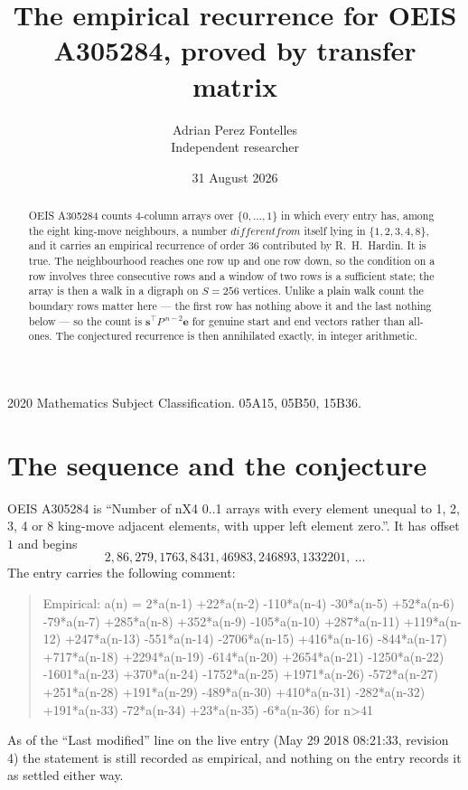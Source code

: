 \documentclass[11pt,a4paper]{article}
\title{The empirical recurrence for OEIS A305284, proved by transfer matrix}
\author{Adrian Perez Fontelles\\ \small Independent researcher}
\date{31 August 2026}
\theoremstyle{plain}
\theoremstyle{definition}
\begin{document}
\maketitle

\begin{abstract}
OEIS A305284 counts $4$-column arrays over $\{0,\dots,1\}$ in which every entry has,
among the eight king-move neighbours, a number $different from$ itself lying in $\{1,2,3,4,8\}$, and it carries an empirical
recurrence of order $36$ contributed by R.~H.~Hardin. It is true. The neighbourhood
reaches one row up and one row down, so the condition on a row involves three consecutive
rows and a window of two rows is a sufficient state; the array is then a walk in a digraph
on $S=256$ vertices. Unlike a plain walk count the boundary rows matter here --- the first
row has nothing above it and the last nothing below --- so the count is
$\mathbf{s}^{\!\top}P^{\,n-2}\mathbf{e}$ for genuine start and end vectors rather than
all-ones. The conjectured recurrence is then annihilated exactly, in integer arithmetic.
\end{abstract}

\noindent\small 2020 Mathematics Subject Classification. 05A15, 05B50, 15B36.\normalsize

\section{The sequence and the conjecture}

OEIS A305284 is ``Number of nX4 0..1 arrays with every element unequal to 1, 2, 3, 4 or 8 king-move adjacent elements, with upper left element zero.''. It has offset
$1$ and begins
\[
2, 86, 279, 1763, 8431, 46983, 246893, 1332201,\ \dots
\]
The entry carries the following comment:
\begin{quote}\small
Empirical: a(n) = 2*a(n-1) +22*a(n-2) -110*a(n-4) -30*a(n-5) +52*a(n-6) -79*a(n-7) +285*a(n-8) +352*a(n-9) -105*a(n-10) +287*a(n-11) +119*a(n-12) +247*a(n-13) -551*a(n-14) -2706*a(n-15) +416*a(n-16) -844*a(n-17) +717*a(n-18) +2294*a(n-19) -614*a(n-20) +2654*a(n-21) -1250*a(n-22) -1601*a(n-23) +370*a(n-24) -1752*a(n-25) +1971*a(n-26) -572*a(n-27) +251*a(n-28) +191*a(n-29) -489*a(n-30) +410*a(n-31) -282*a(n-32) +191*a(n-33) -72*a(n-34) +23*a(n-35) -6*a(n-36) for n>41
\end{quote}
As of the ``Last modified'' line on the live entry (May 29 2018 08:21:33, revision
4) the statement is still recorded as empirical, and nothing on the entry
records it as settled either way.
\end{document}
